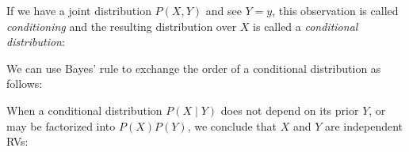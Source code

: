 \documentclass[landscape,a0b,final,a4resizeable]{a0poster}
\newenvironment{poster}{
\begin{center}
\begin{minipage}[c]{0.96\textwidth}
}{
\end{minipage}
\end{center}
}
\theoremstyle{definition}
\theoremstyle{remark}
\begin{document}
\begin{poster}
\begin{multicols}{3}
\vspace{\baselineskip}

\begin{prooftree}
\end{prooftree}

\vspace{\baselineskip}

If we have a joint distribution $P(X, Y)$ and see $Y = y$, this observation is called \textit{conditioning} and the resulting distribution over $X$ is called a \textit{conditional distribution}:

\vspace{\baselineskip}

\begin{prooftree}
\end{prooftree}

\vspace{\baselineskip}

We can use Bayes' rule to exchange the order of a conditional distribution as follows:

\vspace{\baselineskip}

\begin{prooftree}
\end{prooftree}

\vspace{\baselineskip}

When a conditional distribution $P(X \mid Y)$ does not depend on its prior $Y$, or may be factorized into $P(X)P(Y)$, we conclude that $X$ and $Y$ are independent RVs:

\vspace{\baselineskip}


\end{multicols}
\end{poster}
\end{document}
